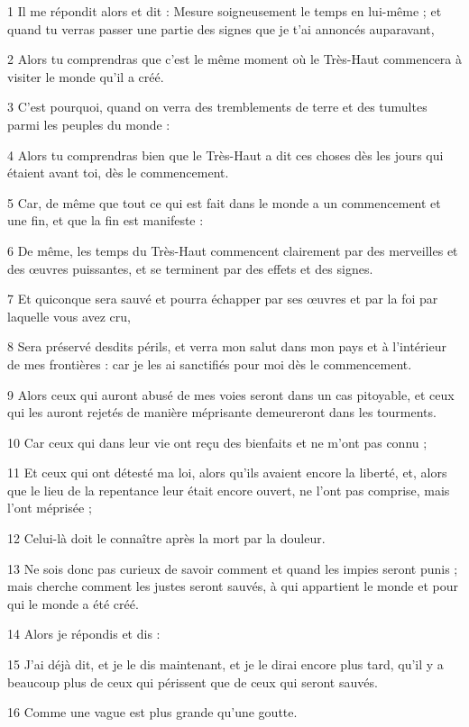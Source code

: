 
\par 1 Il me répondit alors et dit : Mesure soigneusement le temps en lui-même ; et quand tu verras passer une partie des signes que je t'ai annoncés auparavant,
\par 2 Alors tu comprendras que c'est le même moment où le Très-Haut commencera à visiter le monde qu'il a créé.
\par 3 C'est pourquoi, quand on verra des tremblements de terre et des tumultes parmi les peuples du monde :
\par 4 Alors tu comprendras bien que le Très-Haut a dit ces choses dès les jours qui étaient avant toi, dès le commencement.
\par 5 Car, de même que tout ce qui est fait dans le monde a un commencement et une fin, et que la fin est manifeste :
\par 6 De même, les temps du Très-Haut commencent clairement par des merveilles et des œuvres puissantes, et se terminent par des effets et des signes.
\par 7 Et quiconque sera sauvé et pourra échapper par ses œuvres et par la foi par laquelle vous avez cru,
\par 8 Sera préservé desdits périls, et verra mon salut dans mon pays et à l'intérieur de mes frontières : car je les ai sanctifiés pour moi dès le commencement.
\par 9 Alors ceux qui auront abusé de mes voies seront dans un cas pitoyable, et ceux qui les auront rejetés de manière méprisante demeureront dans les tourments.
\par 10 Car ceux qui dans leur vie ont reçu des bienfaits et ne m'ont pas connu ;
\par 11 Et ceux qui ont détesté ma loi, alors qu'ils avaient encore la liberté, et, alors que le lieu de la repentance leur était encore ouvert, ne l'ont pas comprise, mais l'ont méprisée ;
\par 12 Celui-là doit le connaître après la mort par la douleur.
\par 13 Ne sois donc pas curieux de savoir comment et quand les impies seront punis ; mais cherche comment les justes seront sauvés, à qui appartient le monde et pour qui le monde a été créé.
\par 14 Alors je répondis et dis :
\par 15 J'ai déjà dit, et je le dis maintenant, et je le dirai encore plus tard, qu'il y a beaucoup plus de ceux qui périssent que de ceux qui seront sauvés.
\par 16 Comme une vague est plus grande qu'une goutte.
